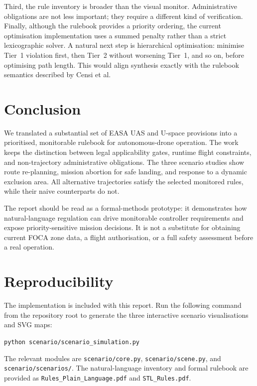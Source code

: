\documentclass[11pt,a4paper]{article}
\begin{document}
Third, the rule inventory is broader than the visual monitor. Administrative obligations are not less important; they require a different kind of verification. Finally, although the rulebook provides a priority ordering, the current optimisation implementation uses a summed penalty rather than a strict lexicographic solver. A natural next step is hierarchical optimisation: minimise Tier~1 violation first, then Tier~2 without worsening Tier~1, and so on, before optimising path length. This would align synthesis exactly with the rulebook semantics described by Censi et al.

\section{Conclusion}

We translated a substantial set of EASA UAS and U-space provisions into a prioritised, monitorable rulebook for autonomous-drone operation. The work keeps the distinction between legal applicability gates, runtime flight constraints, and non-trajectory administrative obligations. The three scenario studies show route re-planning, mission abortion for safe landing, and response to a dynamic exclusion area. All alternative trajectories satisfy the selected monitored rules, while their naive counterparts do not.

The report should be read as a formal-methods prototype: it demonstrates how natural-language regulation can drive monitorable controller requirements and expose priority-sensitive mission decisions. It is not a substitute for obtaining current FOCA zone data, a flight authorisation, or a full safety assessment before a real operation.

\section*{Reproducibility}

The implementation is included with this report. Run the following command from the repository root to generate the three interactive scenario visualisations and SVG maps:
\begin{center}
\texttt{python scenario/scenario\_simulation.py}
\end{center}
The relevant modules are \texttt{scenario/core.py}, \texttt{scenario/scene.py}, and \texttt{scenario/scenarios/}. The natural-language inventory and formal rulebook are provided as \texttt{Rules\_Plain\_Language.pdf} and \texttt{STL\_Rules.pdf}.
\end{document}
